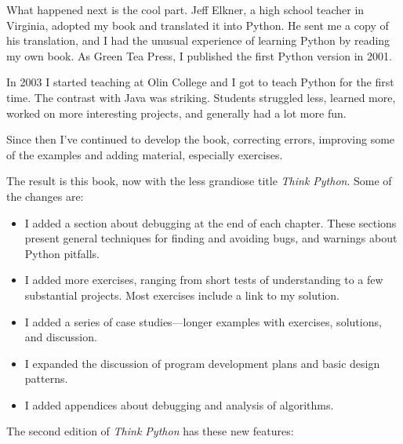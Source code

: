 \documentclass[10pt]{book}
\begin{document}
What happened next is the cool part.  Jeff Elkner, a high school
teacher in Virginia, adopted my book and translated it into
Python.  He sent me a copy of his translation, and I had the
unusual experience of learning Python by reading my own book.
As Green Tea Press, I published the first Python version in 2001.

In 2003 I started teaching at Olin College and I got to teach
Python for the first time.  The contrast with Java was striking.
Students struggled less, learned more, worked on more interesting
projects, and generally had a lot more fun.

Since then I've continued to develop the book,
correcting errors, improving some of the examples and
adding material, especially exercises.

The result is this book, now with the less grandiose title
{\em Think Python}.  Some of the changes are:

\begin{itemize}

\item I added a section about debugging at the end of each chapter.
  These sections present general techniques for finding and avoiding
  bugs, and warnings about Python pitfalls.

\item I added more exercises, ranging from short tests of
  understanding to a few substantial projects.  Most exercises
  include a link to my solution.

\item I added a series of case studies---longer examples with
  exercises, solutions, and discussion.
  
\item I expanded the discussion of program development plans
  and basic design patterns.

\item I added appendices about debugging and analysis of algorithms.

\end{itemize}

The second edition of {\em Think Python} has these new features:
\end{document}
